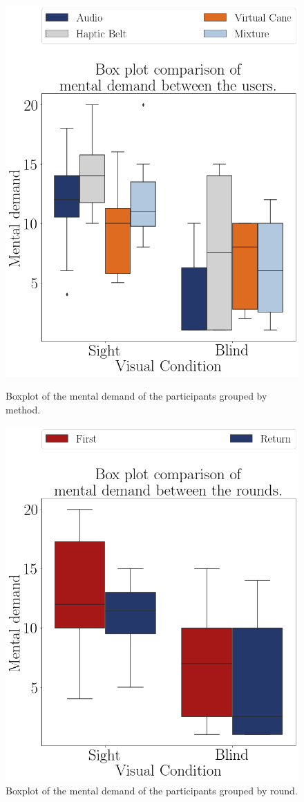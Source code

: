 \begin{figure}[!htb]
    \centering
    \begin{minipage}{0.45\textwidth}
        \centering
        \includegraphics[width = 0.8\linewidth]{Resultados/Nasa/Figuras/png/boxplot_noBase_md_4_scene.png}
        \caption{Boxplot of the mental demand of the participants grouped by method.}
        \label{fig:boxplot_noBase_md_4_scene}
    \end{minipage}
    \begin{minipage}{0.45\textwidth}
        \centering
        \includegraphics[width = 0.8\linewidth]{Resultados/Nasa/Figuras/png/boxplot_noBase_md_4_rounds.png}
        \caption{Boxplot of the mental demand of the participants grouped by round.}
        \label{fig:boxplot_noBase_md_4_rounds}
    \end{minipage}
\end{figure}

